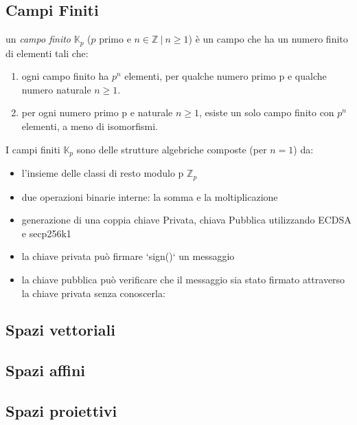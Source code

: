 \documentclass{book}
\theoremstyle{definition}
\newcommand{\Kp}{\mathbb{K}_{p}}
\newcommand{\Zp}{\mathbb{Z}_{p}}
\begin{document}
\subsection{Campi Finiti}
un \textit{campo finito} $\Kp$ ($p$ primo e $n \in \mathbb{Z} \ | \ n \ge 1$) è un campo che ha un numero finito di elementi tali che:

\begin{enumerate}
    \item ogni campo finito ha $p^{n}$ elementi, per qualche numero primo p e qualche numero naturale $n \ge 1$.
    \item per ogni numero primo p e naturale $n \ge 1$, esiste un solo campo finito con $p^{n}$ elementi, a meno di isomorfismi.
\end{enumerate}

I campi finiti $\Kp$ sono delle strutture algebriche composte (per $n = 1$) da:

\begin{itemize}
    \item l'insieme delle classi di resto modulo p $\Zp$
    \item due operazioni binarie interne: la somma e la moltiplicazione
\end{itemize}

\begin{itemize}
    \item generazione di una coppia chiave Privata, chiava Pubblica utilizzando ECDSA e secp256k1
    \item la chiave privata può firmare `sign()` un messaggio
    \item la chiave pubblica può verificare che il messaggio sia stato firmato attraverso la chiave privata senza conoscerla: %
\end{itemize}

\subsection{Spazi vettoriali}

\subsection{Spazi affini}

\subsection{Spazi proiettivi}
\end{document}
